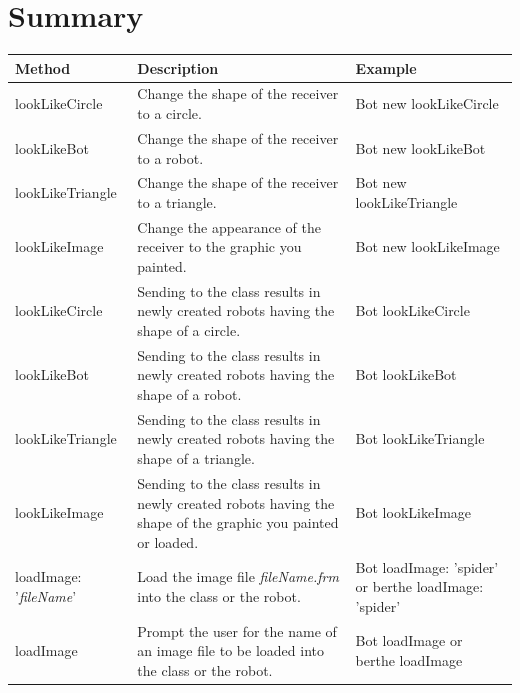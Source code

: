\documentclass[a4paper,10pt,twoside]{book}
\begin{document}
\section{Summary}
\noindent
{\small \begin{tabular}{p{20mm}p{50mm}p{30mm}}
\hline
\textbf{Method} & \textbf{Description} & \textbf{Example}\\
\hline
\textsf{lookLikeCircle} & Change the shape of the receiver to a circle. & \textsf{Bot new lookLikeCircle} \\

\textsf{lookLikeBot} & Change the shape of the receiver to a robot. & \textsf{Bot new lookLikeBot} \\

\textsf{lookLikeTriangle} & Change the shape of the receiver to a triangle. & \textsf{Bot new lookLikeTriangle} \\

\textsf{lookLikeImage} & Change the appearance of the receiver to the graphic you painted. & \textsf{Bot new lookLikeImage} \\

\textsf{lookLikeCircle} & Sending to the class results in newly created robots having the shape of a circle. 
& \textsf{Bot lookLikeCircle} \\

\textsf{lookLikeBot} & Sending to the class results in newly created robots having the shape of a robot. & \textsf{Bot lookLikeBot} \\

\textsf{lookLikeTriangle} & Sending to the class results in newly created robots having the shape of a triangle. 
& \textsf{Bot lookLikeTriangle} \\

\textsf{lookLikeImage} & Sending to the class results in newly created robots having the shape of the graphic you painted or loaded. & \textsf{Bot lookLikeImage} \\

\textsf{loadImage: '{\itshape fileName}'} & Load the image file \emph{fileName.frm} into the class or the robot.
& \textsf{Bot loadImage: 'spider'} \newline or \newline \textsf{berthe loadImage: 'spider'} \\

\textsf{loadImage} & Prompt the user for the name of an image file to be loaded into the class or the robot. 
& \textsf{Bot loadImage} or \newline  \textsf{berthe loadImage} \\


\end{tabular}}
\end{document}
